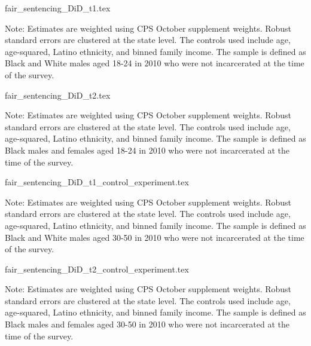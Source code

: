 {fair_sentencing_DiD_t1.tex}
\begin{footnotesize}
  \noindent Note: Estimates are weighted using CPS October supplement weights. Robust standard errors are clustered at the state level. The controls used include age, age-squared, Latino ethnicity, and binned family income. The sample is defined as Black and White males aged 18-24 in 2010 who were not incarcerated at the time of the survey.
\end{footnotesize}

{fair_sentencing_DiD_t2.tex}
\begin{footnotesize}
  \noindent Note: Estimates are weighted using CPS October supplement weights. Robust standard errors are clustered at the state level. The controls used include age, age-squared, Latino ethnicity, and binned family income. The sample is defined as Black males and females aged 18-24 in 2010 who were not incarcerated at the time of the survey.
\end{footnotesize}
\clearpage

{fair_sentencing_DiD_t1_control_experiment.tex}
\begin{footnotesize}
  \noindent Note: Estimates are weighted using CPS October supplement weights. Robust standard errors are clustered at the state level. The controls used include age, age-squared, Latino ethnicity, and binned family income. The sample is defined as Black and White males aged 30-50 in 2010 who were not incarcerated at the time of the survey.
\end{footnotesize}

{fair_sentencing_DiD_t2_control_experiment.tex}
\begin{footnotesize}
  \noindent Note: Estimates are weighted using CPS October supplement weights. Robust standard errors are clustered at the state level. The controls used include age, age-squared, Latino ethnicity, and binned family income. The sample is defined as Black males and females aged 30-50 in 2010 who were not incarcerated at the time of the survey.
\end{footnotesize}
\clearpage


